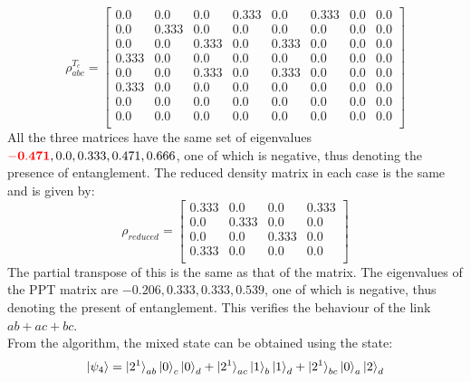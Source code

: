 \documentclass{scrartcl}
\begin{document}
            \begin{equation*}
                \rho^{T_c}_{abc}=
                \left[
                \begin{array}{cccccccc}
                0.0 & 0.0 & 0.0 & 0.333 & 0.0 & 0.333 & 0.0 & 0.0 \\
                0.0 & 0.333 & 0.0 & 0.0 & 0.0 & 0.0 & 0.0 & 0.0 \\
                0.0 & 0.0 & 0.333 & 0.0 & 0.333 & 0.0 & 0.0 & 0.0 \\
                0.333 & 0.0 & 0.0 & 0.0 & 0.0 & 0.0 & 0.0 & 0.0 \\
                0.0 & 0.0 & 0.333 & 0.0 & 0.333 & 0.0 & 0.0 & 0.0 \\
                0.333 & 0.0 & 0.0 & 0.0 & 0.0 & 0.0 & 0.0 & 0.0 \\
                0.0 & 0.0 & 0.0 & 0.0 & 0.0 & 0.0 & 0.0 & 0.0 \\
                0.0 & 0.0 & 0.0 & 0.0 & 0.0 & 0.0 & 0.0 & 0.0 \\
                \end{array}
                \right]
                \end{equation*}
               All the three matrices have the same set of eigenvalues $\mathbf{\mathcolor{red}{-0.471}}, 0.0, 0.333, 0.471, 0.666$, one of which is negative, thus denoting the presence of entanglement. The reduced density matrix in each case is the same and is given by:
               \begin{equation*}
                \rho_{reduced} =
                \left[
                \begin{array}{cccc}
                0.333 & 0.0 & 0.0 & 0.333 \\
                0.0 & 0.333 & 0.0 & 0.0 \\
                0.0 & 0.0 & 0.333 & 0.0 \\
                0.333 & 0.0 & 0.0 & 0.0 \\
                \end{array}
                \right]
                \end{equation*}
                The partial transpose of this is the same as that of the matrix. The eigenvalues of the PPT matrix are $-0.206, 0.333, 0.333, 0.539$, one of which is negative, thus denoting the present of entanglement. This verifies the behaviour of the link $ab+ac+bc$. \\[0.3cm]
From the algorithm, the mixed state can be obtained using the state:
$$\ket{\psi_4} = \ket{2^1}_{ab}\ket{0}_c\ket{0}_d+\ket{2^1}_{ac}\ket{1}_b\ket{1}_d+\ket{2^1}_{bc}\ket{0}_a\ket{2}_d$$
\end{document}
